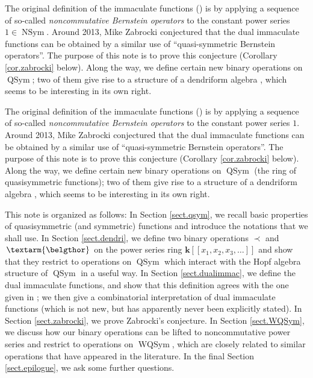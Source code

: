 \documentclass[numbers=enddot,12pt,final,onecolumn,notitlepage,abstracton]{scrartcl}%
\theoremstyle{definition}
\newenvironment{verlong}{}{}
\newenvironment{vershort}{}{}
\newcommand{\bel}{\left. \textarm{\belgthor} \right.}
\begin{document}
\begin{vershort}
The original definition of the immaculate functions (\cite[Definition
3.2]{BBSSZ}) is by applying a sequence of so-called \textit{noncommutative
Bernstein operators} to the constant power series $1\in\operatorname*{NSym}$.
Around 2013, Mike Zabrocki conjectured that the dual immaculate functions can
be obtained by a similar use of \textquotedblleft quasi-symmetric Bernstein
operators\textquotedblright. The purpose of this note is to prove this
conjecture (Corollary \ref{cor.zabrocki} below). Along the way, we define
certain new binary operations on $\operatorname*{QSym}$; two of them give rise
to a structure of a dendriform algebra \cite{EbrFar08}, which seems to be
interesting in its own right.
\end{vershort}

\begin{verlong}
The original definition of the immaculate functions (\cite[Definition
3.2]{BBSSZ}) is by applying a sequence of so-called \textit{noncommutative
Bernstein operators} to the constant power series $1$. Around 2013, Mike
Zabrocki conjectured that the dual immaculate functions can be obtained by a
similar use of \textquotedblleft quasi-symmetric Bernstein
operators\textquotedblright. The purpose of this note is to prove this
conjecture (Corollary \ref{cor.zabrocki} below). Along the way, we define
certain new binary operations on $\operatorname*{QSym}$ (the ring of
quasisymmetric functions); two of them give rise to a structure of a
dendriform algebra \cite{EbrFar08}, which seems to be interesting in its own right.
\end{verlong}

This note is organized as follows: In Section \ref{sect.qsym}, we recall basic
properties of quasisymmetric (and symmetric) functions and introduce the
notations that we shall use. In Section \ref{sect.dendri}, we define two
binary operations $\left.  \prec\right.  $ and $\bel $ on the power series
ring $\mathbf{k}\left[  \left[  x_{1},x_{2},x_{3},\ldots\right]  \right]  $
and show that they restrict to operations on $\operatorname*{QSym}$ which
interact with the Hopf algebra structure of $\operatorname*{QSym}$ in a useful
way. In Section \ref{sect.dualimmac}, we define the dual immaculate functions,
and show that this definition agrees with the one given in \cite[Remark
3.28]{BBSSZ}; we then give a combinatorial interpretation of dual immaculate
functions (which is not new, but has apparently never been explicitly stated).
In Section \ref{sect.zabrocki}, we prove Zabrocki's conjecture. In Section
\ref{sect.WQSym}, we discuss how our binary operations can be lifted to
noncommutative power series and restrict to operations on
$\operatorname*{WQSym}$, which are closely related to similar operations that
have appeared in the literature. In the final Section \ref{sect.epilogue}, we
ask some further questions.
\end{document}
